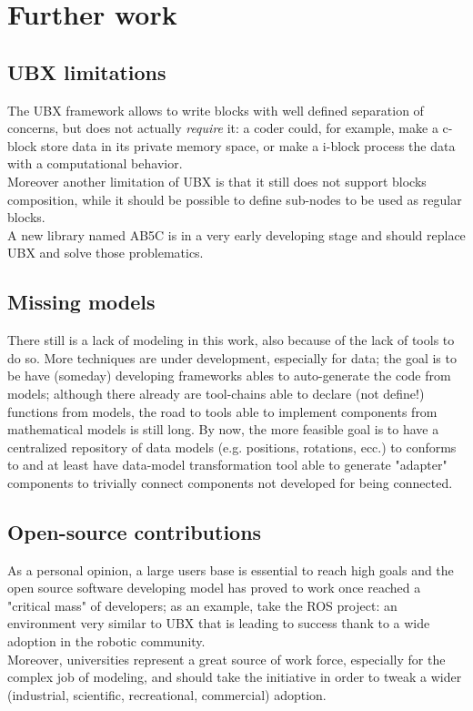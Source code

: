 \chapter{Further work}
\label{ch:further}
\section{UBX limitations}
The UBX framework allows to write blocks with well defined separation of concerns, but does not actually \emph{require} it: a coder could, for example, make a c-block store data in its private memory space, or make a i-block process the data with a computational behavior.\\
Moreover another limitation of UBX is that it still does not support blocks composition, while it should be possible to define sub-nodes to be used as regular blocks.\\
A new library named AB5C is in a very early developing stage and should replace UBX and solve those problematics.

\section{Missing models}
There still is a lack of modeling in this work, also because of the lack of tools to do so. More techniques are under development, especially for data; the goal is to be have (someday) developing frameworks ables to auto-generate the code from models; although there already are tool-chains able to declare (not define!) functions from models, the road to tools able to implement components from mathematical models is still long. By now, the more feasible goal is to have a centralized repository of data models (e.g. positions, rotations, ecc.) to conforms to and at least have data-model transformation tool able to generate "adapter" components to trivially connect components not developed for being connected.\\

\section{Open-source contributions}
As a personal opinion, a large users base is essential to reach high goals and the open source software developing model has proved to work once reached a "critical mass" of developers; as an example, take the ROS project: an environment very similar to UBX that is leading to success thank to a wide adoption in the robotic community.\\
Moreover, universities represent a great source of work force, especially for the complex job of modeling, and should take the initiative in order to tweak a wider (industrial, scientific, recreational, commercial) adoption.

